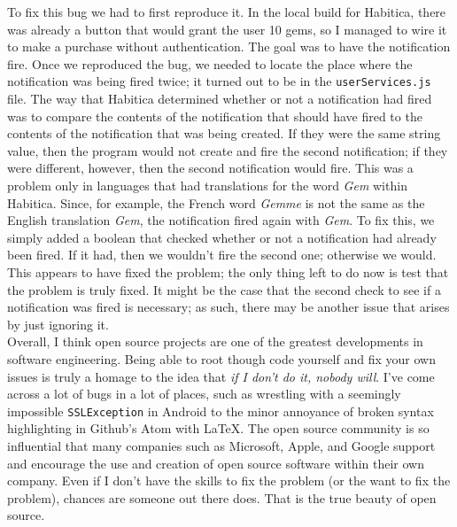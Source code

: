 \documentclass[12pt]{article}
\begin{document}
To fix this bug we had to first reproduce it. In the local build for Habitica, there was already a button that would grant the user 10 gems, so I managed to wire it to make a purchase without authentication. The goal was to have the notification fire. Once we reproduced the bug, we needed to locate the place where the notification was being fired twice; it turned out to be in the \texttt{userServices.js} file. The way that Habitica determined whether or not a notification had fired was to compare the contents of the notification that should have fired to the contents of the notification that was being created. If they were the same string value, then the program would not create and fire the second notification; if they were different, however, then the second notification would fire. This was a problem only in languages that had translations for the word \textit{Gem} within Habitica. Since, for example, the French word \textit{Gemme} is not the same as the English translation \textit{Gem}, the notification fired again with \textit{Gem}. To fix this, we simply added a boolean that checked whether or not a notification had already been fired. If it had, then we wouldn't fire the second one; otherwise we would. This appears to have fixed the problem; the only thing left to do now is test that the problem is truly fixed. It might be the case that the second check to see if a notification was fired is necessary; as such, there may be another issue that arises by just ignoring it.\\

Overall, I think open source projects are one of the greatest developments in software engineering. Being able to root though code yourself and fix your own issues is truly a homage to the idea that \textit{if I don't do it, nobody will}. I've come across a lot of bugs in a lot of places, such as wrestling with a seemingly impossible \texttt{SSLException} in Android to the minor annoyance of broken syntax highlighting in Github's Atom with \LaTeX. The open source community is so influential that many companies such as Microsoft, Apple, and Google support and encourage the use and creation of open source software within their own company. Even if I don't have the skills to fix the problem (or the want to fix the problem), chances are someone out there does. That is the true beauty of open source.
\end{document}
